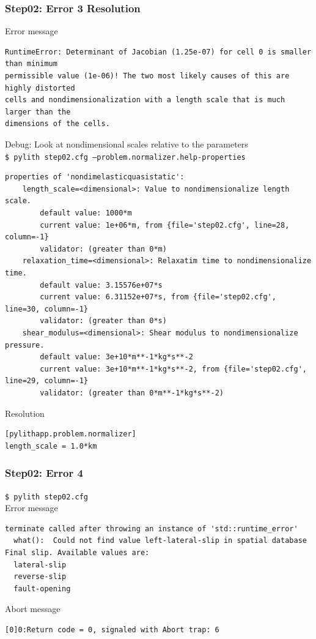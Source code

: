\documentclass{beamer}
\newcommand{\cmd}[1]{{\tiny\tt \color{ltred}#1}}
\newcommand{\errlabel}[1]{{\small \color{blue}#1}}
\newcommand{\debuginfo}[1]{{\small \color{green}#1}}
\begin{document}
\begin{frame}[fragile]
  \frametitle{Step02: Error 3 Resolution}

\errlabel{Error message}
\begin{lstlisting}
RuntimeError: Determinant of Jacobian (1.25e-07) for cell 0 is smaller than minimum
permissible value (1e-06)! The two most likely causes of this are highly distorted
cells and nondimensionalization with a length scale that is much larger than the 
dimensions of the cells.
\end{lstlisting}\pause
\errlabel{Debug:} \debuginfo{Look at nondimensional scales relative to the parameters}\\
\cmd{\$ pylith step02.cfg --problem.normalizer.help-properties}
\begin{lstlisting}
properties of 'nondimelasticquasistatic':
    length_scale=<dimensional>: Value to nondimensionalize length scale.
        default value: 1000*m
        current value: 1e+06*m, from {file='step02.cfg', line=28, column=-1}
        validator: (greater than 0*m)
    relaxation_time=<dimensional>: Relaxatim time to nondimensionalize time.
        default value: 3.15576e+07*s
        current value: 6.31152e+07*s, from {file='step02.cfg', line=30, column=-1}
        validator: (greater than 0*s)
    shear_modulus=<dimensional>: Shear modulus to nondimensionalize pressure.
        default value: 3e+10*m**-1*kg*s**-2
        current value: 3e+10*m**-1*kg*s**-2, from {file='step02.cfg', line=29, column=-1}
        validator: (greater than 0*m**-1*kg*s**-2)
\end{lstlisting}\pause
\errlabel{Resolution}
\begin{lstlisting}
[pylithapp.problem.normalizer]
length_scale = 1.0*km
\end{lstlisting}

\end{frame}


\begin{frame}[fragile]
  \frametitle{Step02: Error 4}

\cmd{\$ pylith step02.cfg}\\
\errlabel{Error message}
\begin{lstlisting}
terminate called after throwing an instance of 'std::runtime_error'
  what():  Could not find value left-lateral-slip in spatial database
Final slip. Available values are:
  lateral-slip
  reverse-slip
  fault-opening
\end{lstlisting}
\errlabel{Abort message}
\begin{lstlisting}
[0]0:Return code = 0, signaled with Abort trap: 6
\end{lstlisting}

\end{frame}
\end{document}
